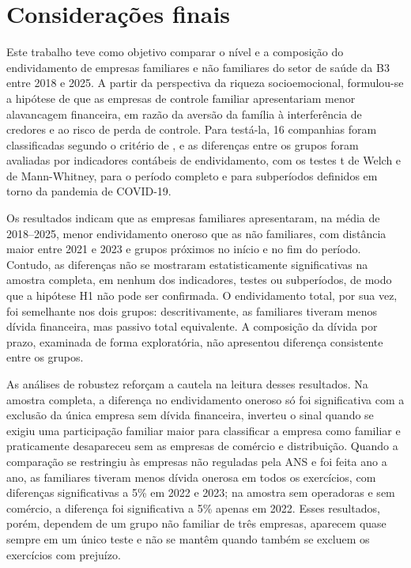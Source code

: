 \chapter{Considerações finais}\label{cap:consideracoes}

Este trabalho teve como objetivo comparar o nível e a composição do endividamento
de empresas familiares e não familiares do setor de saúde da B3 entre 2018 e 2025.
A partir da perspectiva da riqueza socioemocional, formulou-se a hipótese de que as
empresas de controle familiar apresentariam menor alavancagem financeira, em razão
da aversão da família à interferência de credores e ao risco de perda de controle.
Para testá-la, 16 companhias foram classificadas segundo o critério de
, e as diferenças entre os grupos foram avaliadas por
indicadores contábeis de endividamento, com os testes t de Welch e de
Mann-Whitney, para o período completo e para subperíodos definidos em torno da
pandemia de COVID-19.

Os resultados indicam que as empresas familiares apresentaram, na média de
2018--2025, menor endividamento oneroso que as não familiares, com distância maior
entre 2021 e 2023 e grupos próximos no início e no fim do período. Contudo, as
diferenças não se mostraram estatisticamente significativas na amostra completa,
em nenhum dos indicadores, testes ou subperíodos, de modo que a hipótese H1 não
pode ser confirmada. O endividamento total, por sua vez, foi semelhante nos dois
grupos: descritivamente, as familiares tiveram menos dívida financeira, mas passivo
total equivalente. A composição da dívida por prazo, examinada de forma
exploratória, não apresentou diferença consistente entre os grupos.

As análises de robustez reforçam a cautela na leitura desses resultados. Na amostra
completa, a diferença no endividamento oneroso só foi significativa com a exclusão
da única empresa sem dívida financeira, inverteu o sinal quando se exigiu uma
participação familiar maior para classificar a empresa como familiar e praticamente
desapareceu sem as empresas de comércio e distribuição. Quando a comparação se
restringiu às empresas não reguladas pela ANS e foi feita ano a ano, as familiares
tiveram menos dívida onerosa em todos os exercícios, com diferenças significativas a
5\% em 2022 e 2023; na amostra sem operadoras e sem comércio, a diferença foi
significativa a 5\% apenas em 2022. Esses resultados, porém, dependem de um grupo
não familiar de três empresas, aparecem quase sempre em um único teste e não se
mantêm quando também se excluem os exercícios com prejuízo.

